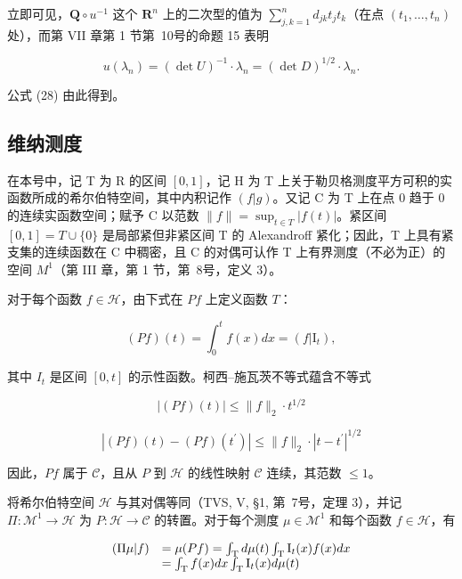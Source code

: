 立即可见，\(\mathbf{Q} \circ u^{-1}\) 这个 \(\mathbf{R}^n\) 上的二次型的值为 \(\sum_{j,k=1}^{n} d_{jk} t_j t_k\)（在点 \((t_1, \ldots, t_n)\) 处），而第 VII 章第 1 节第~10号的命题 15 表明

\[
u (\lambda_ {n}) = (\det U) ^ {- 1} \cdot \lambda_ {n} = (\det D) ^ {1 / 2} \cdot \lambda_ {n}.\tag{30}
\]

公式 (28) 由此得到。

\subsection{维纳测度}

在本号中，记 T 为 R 的区间 \([0,1]\)，记 H 为 T 上关于勒贝格测度平方可积的实函数所成的希尔伯特空间，其中内积记作 \((f|g)\)。又记 C 为 T 上在点 0 趋于 0 的连续实函数空间；赋予 C 以范数 \(\|f\| = \sup_{t \in T} |f(t)|\)。紧区间 \([0,1] = T \cup \{0\}\) 是局部紧但非紧区间 T 的 Alexandroff 紧化；因此，T 上具有紧支集的连续函数在 C 中稠密，且 C 的对偶可认作 T 上有界测度（不必为正）的空间 \(M^{1}\)（第 III 章，第 1 节，第~8号，定义 3）。

对于每个函数 \(f \in \mathcal{H}\)，由下式在 \(Pf\) 上定义函数 \(T\)：

\[
(P f) (t) = \int_ {0} ^ {t} f (x) d x = (f | \mathrm{I} _ {t}),\tag{31}
\]

其中 \(I_{t}\) 是区间 \([0, t]\) 的示性函数。柯西--施瓦茨不等式蕴含不等式

\[
| (P f) (t) | \leqslant \| f \| _ {2} \cdot t ^ {1 / 2}\tag{32}
\]

\[
\left| (P f) (t) - (P f) \left(t ^ {\prime}\right) \right| \leqslant \| f \| _ {2} \cdot \left| t - t ^ {\prime} \right| ^ {1 / 2}\tag{33}
\]

因此，\(Pf\) 属于 \(\mathcal{C}\)，且从 \(P\) 到 \(\mathcal{H}\) 的线性映射 \(\mathcal{C}\) 连续，其范数 \(\leqslant 1\)。

将希尔伯特空间 \(\mathcal{H}\) 与其对偶等同（TVS, V, §1, 第~7号，定理 3），并记 \(\Pi : \mathcal{M}^1 \to \mathcal{H}\) 为 \(P: \mathcal{H} \to \mathcal{C}\) 的转置。对于每个测度 \(\mu \in \mathcal{M}^1\) 和每个函数 \(f \in \mathcal{H}\)，有

\[
\begin{array}{r l} (\Pi \mu | f) & = \mu (P f) = \int_ {\mathrm{T}} d \mu (t) \int_ {\mathrm{T}} \mathrm{I} _ {t} (x) f (x) d x \\ & = \int_ {\mathrm{T}} f (x) d x \int_ {\mathrm{T}} \mathrm{I} _ {t} (x) d \mu (t) \end{array}
\]

